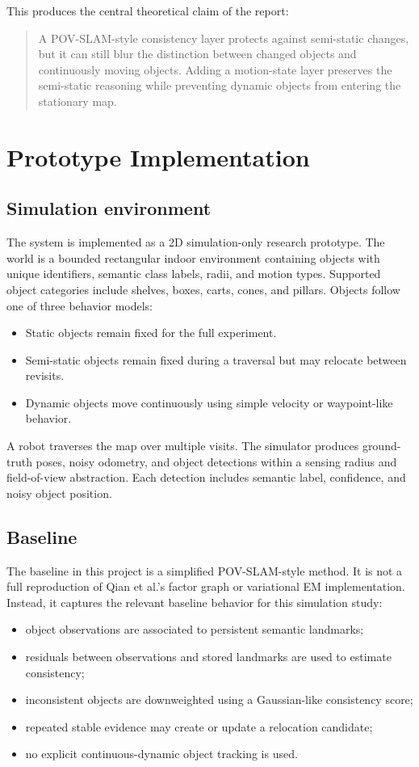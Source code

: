 ﻿\documentclass[11pt]{article}
\begin{document}
This produces the central theoretical claim of the report:
\begin{quote}
A POV-SLAM-style consistency layer protects against semi-static changes, but it can still blur the distinction between changed objects and continuously moving objects. Adding a motion-state layer preserves the semi-static reasoning while preventing dynamic objects from entering the stationary map.
\end{quote}

\section{Prototype Implementation}
\subsection{Simulation environment}
The system is implemented as a 2D simulation-only research prototype. The world is a bounded rectangular indoor environment containing objects with unique identifiers, semantic class labels, radii, and motion types. Supported object categories include shelves, boxes, carts, cones, and pillars. Objects follow one of three behavior models:
\begin{itemize}[leftmargin=*]
    \item Static objects remain fixed for the full experiment.
    \item Semi-static objects remain fixed during a traversal but may relocate between revisits.
    \item Dynamic objects move continuously using simple velocity or waypoint-like behavior.
\end{itemize}

A robot traverses the map over multiple visits. The simulator produces ground-truth poses, noisy odometry, and object detections within a sensing radius and field-of-view abstraction. Each detection includes semantic label, confidence, and noisy object position.

\subsection{Baseline}
The baseline in this project is a simplified POV-SLAM-style method. It is not a full reproduction of Qian et al.'s factor graph or variational EM implementation. Instead, it captures the relevant baseline behavior for this simulation study:
\begin{itemize}[leftmargin=*]
    \item object observations are associated to persistent semantic landmarks;
    \item residuals between observations and stored landmarks are used to estimate consistency;
    \item inconsistent objects are downweighted using a Gaussian-like consistency score;
    \item repeated stable evidence may create or update a relocation candidate;
    \item no explicit continuous-dynamic object tracking is used.
\end{itemize}
\end{document}
